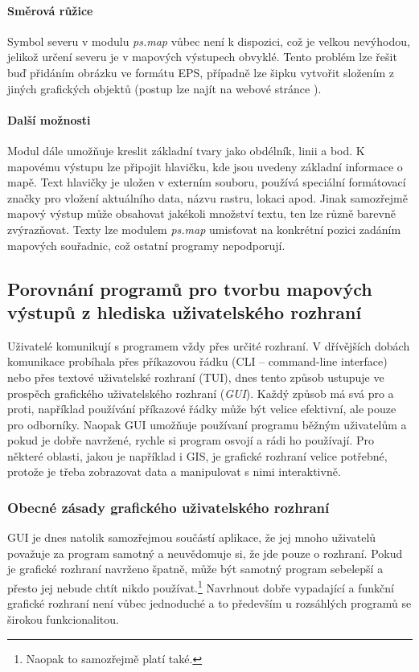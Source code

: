 \documentclass[a4paper,12pt,draft]{article}
\newcommand{\modul}[1]{\emph{#1}}
\begin{document}
\paragraph*{Směrová růžice}
Symbol severu v modulu \modul{ps.map} vůbec není k dispozici, což je velkou
nevýhodou, jelikož určení severu je v mapových výstupech obvyklé. Tento
problém lze řešit buď přidáním obrázku ve formátu EPS, případně
lze šipku vytvořit složením z jiných grafických objektů (postup lze
najít na webové stránce \cite{wiki_psmap_north}).

\paragraph*{Další možnosti}
Modul dále umožňuje kreslit základní tvary jako obdélník, linii a
bod. K mapovému výstupu lze připojit hlavičku, kde jsou uvedeny základní
informace o mapě. Text hlavičky je uložen v externím souboru, používá
speciální formátovací značky pro vložení aktuálního data, názvu
rastru, lokaci apod. Jinak samozřejmě mapový výstup může obsahovat
jakékoli množství textu, ten lze různě barevně zvýrazňovat. Texty lze
modulem \modul{ps.map} umisťovat na konkrétní pozici zadáním mapových
souřadnic, což ostatní programy nepodporují.




\subsection{Porovnání programů pro tvorbu mapových výstupů z hlediska
uživatelského rozhraní}
Uživatelé komunikují s programem vždy přes určité rozhraní. V
dřívějších dobách komunikace probíhala přes příkazovou
řádku (CLI -- command-line interface) nebo přes textové uživatelské
rozhraní (TUI), dnes tento způsob ustupuje ve prospěch grafického
uživatelského
rozhraní (\emph{GUI}). Každý způsob má svá pro a proti, například
používání příkazové řádky může být velice efektivní, ale pouze
pro odborníky. Naopak GUI umožňuje používaní programu běžným
uživatelům a pokud je dobře navržené, rychle si program osvojí a
rádi ho používají. Pro některé oblasti, jakou je například i GIS,
je grafické rozhraní velice potřebné, protože je třeba zobrazovat data
a manipulovat s nimi interaktivně.

\subsubsection{Obecné zásady grafického uživatelského rozhraní}
GUI je dnes natolik samozřejmou součástí aplikace, že jej mnoho
uživatelů považuje za program samotný a neuvědomuje si, že jde
pouze o rozhraní. Pokud je grafické rozhraní navrženo špatně,
může být samotný program sebelepší a přesto jej nebude chtít nikdo
používat.\footnote{Naopak to samozřejmě platí také.} Navrhnout dobře
vypadající a funkční grafické rozhraní není vůbec jednoduché a to
především u rozsáhlých programů se širokou funkcionalitou.
\end{document}
